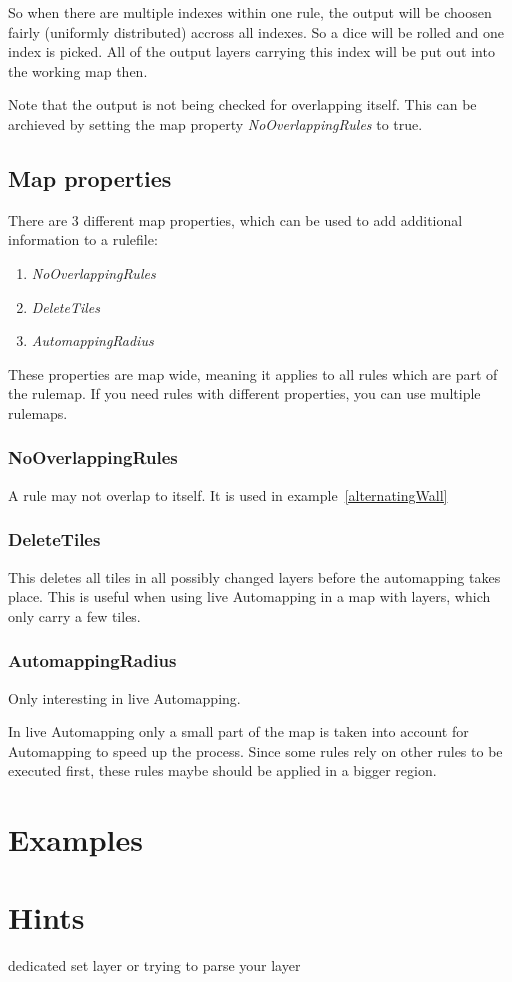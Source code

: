\documentclass[dvips, a4paper, 12pt,listof=totoc, oneside, parskip]{scrbook}
\begin{document}
So when there are multiple indexes within one rule, the output will be choosen
fairly (uniformly distributed) accross all indexes. So a dice will be rolled and one index is picked.
All of the output layers carrying this index will be put out into the working map then.

Note that the output is not being checked for overlapping itself. This can be archieved by
setting the map property \emph{NoOverlappingRules} to true.




\section{Map properties}

There are 3 different map properties, which can be used to add additional
information to a rulefile:
\begin{enumerate}
  \item \emph{NoOverlappingRules}
  \item \emph{DeleteTiles}
  \item \emph{AutomappingRadius}
\end{enumerate}
These properties are map wide, meaning it applies to all rules which are part of the rulemap.
If you need rules with different properties, you can use multiple rulemaps.


\subsection{NoOverlappingRules}
A rule may not overlap to itself. It is used in example~\ref{alternatingWall}

\subsection{DeleteTiles}
This deletes all tiles in all possibly changed layers before the automapping takes place.
This is useful when using live Automapping in a map with layers, which only carry
a few tiles.

\subsection{AutomappingRadius}
Only interesting in live Automapping.

In live Automapping only a small part of the map is taken into account for Automapping to speed
up the process.
Since some rules rely on other rules to be executed first, these rules maybe should be
applied in a bigger region.

\chapter{Examples}






\chapter{Hints}

dedicated set layer or trying to parse your layer
\end{document}
